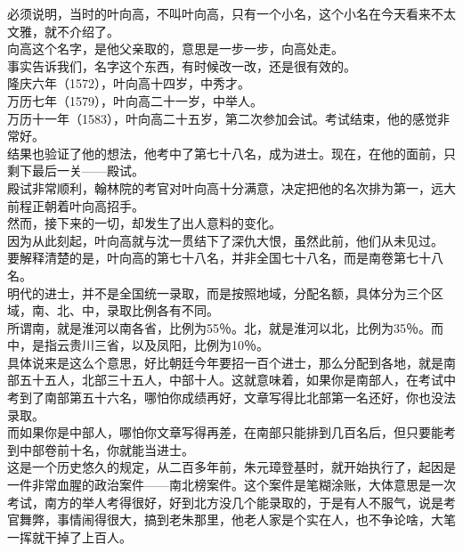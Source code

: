 \begin{multicols}{\theparacolNo}
必须说明，当时的叶向高，不叫叶向高，只有一个小名，这个小名在今天看来不太文雅，就不介绍了。\\

向高这个名字，是他父亲取的，意思是一步一步，向高处走。\\

事实告诉我们，名字这个东西，有时候改一改，还是很有效的。\\

隆庆六年（1572），叶向高十四岁，中秀才。\\

万历七年（1579），叶向高二十一岁，中举人。\\

万历十一年（1583），叶向高二十五岁，第二次参加会试。考试结束，他的感觉非常好。\\

结果也验证了他的想法，他考中了第七十八名，成为进士。现在，在他的面前，只剩下最后一关——殿试。\\

殿试非常顺利，翰林院的考官对叶向高十分满意，决定把他的名次排为第一，远大前程正朝着叶向高招手。\\

然而，接下来的一切，却发生了出人意料的变化。\\

因为从此刻起，叶向高就与沈一贯结下了深仇大恨，虽然此前，他们从未见过。\\

要解释清楚的是，叶向高的第七十八名，并非全国七十八名，而是南卷第七十八名。\\

明代的进士，并不是全国统一录取，而是按照地域，分配名额，具体分为三个区域，南、北、中，录取比例各有不同。\\

所谓南，就是淮河以南各省，比例为55％。北，就是淮河以北，比例为35％。而中，是指云贵川三省，以及凤阳，比例为10％。\\

具体说来是这么个意思，好比朝廷今年要招一百个进士，那么分配到各地，就是南部五十五人，北部三十五人，中部十人。这就意味着，如果你是南部人，在考试中考到了南部第五十六名，哪怕你成绩再好，文章写得比北部第一名还好，你也没法录取。\\

而如果你是中部人，哪怕你文章写得再差，在南部只能排到几百名后，但只要能考到中部卷前十名，你就能当进士。\\

这是一个历史悠久的规定，从二百多年前，朱元璋登基时，就开始执行了，起因是一件非常血腥的政治案件——南北榜案件。这个案件是笔糊涂账，大体意思是一次考试，南方的举人考得很好，好到北方没几个能录取的，于是有人不服气，说是考官舞弊，事情闹得很大，搞到老朱那里，他老人家是个实在人，也不争论啥，大笔一挥就干掉了上百人。\\


\end{multicols}
